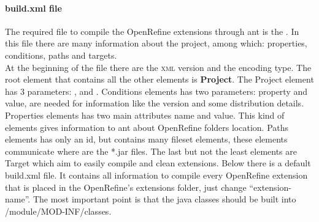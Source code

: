\paragraph{build.xml file} The required file to compile the OpenRefine extensions through ant is the . In this file there are many information about the project, among which: properties, conditions, paths and targets.\\
At the beginning of the file there are the \textsc{xml} version and the encoding type. The root element that contains all the other elements is \textbf{Project}. The \textsf{Project} element has 3 parameters: ,  and . \textsf{Conditions} elements has two parameters: property and value, are needed for information like the version and some distribution details. \textsf{Properties} elements has two main attributes name and value. This kind of elements gives information to ant about OpenRefine folders location. \textsf{Paths} elements has only an id, but contains many \textsf{fileset} elements, these elements communicate where are the *.jar files. The last but not the least elements are \textsf{Target} which aim to easily compile and clean extensions. Below there is a default build.xml file. It contains all information to compile every OpenRefine extension that is placed in the OpenRefine's extensions folder, just change ``extension-name''. The most important point is that the java classes should be built into \textsf{/module/MOD-INF/classes}.

